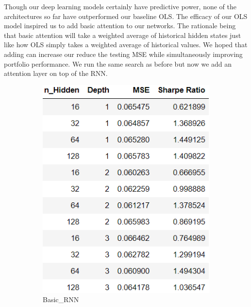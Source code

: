 \documentclass[11pt, letterpaper, headings=standardclasses]{scrartcl}
\begin{document}
	Though our deep learning models certainly have predictive power, none of the architectures so far have outperformed our baseline OLS. The efficacy of our OLS model inspired us to add basic attention to our networks. The rationale being that basic attention will take a weighted average of historical hidden states just like how OLS simply takes a weighted average of historical values. We hoped that adding can increase our reduce the testing MSE while simultaneously improving portfolio performance. We run the same search as before but now we add an attention layer on top of the RNN.

	\begin{figure}[H]
    \centering
        \begin{subfigure}{.33\textwidth}
      \centering
      \includegraphics[width=.9\linewidth]{RNN_att.png}
      \caption{Basic\_RNN}
      \label{fig:sub1}
    \end{subfigure}%
    \begin{subfigure}{.33\textwidth}
      \centering

\end{subfigure}
\end{figure}
\end{document}
